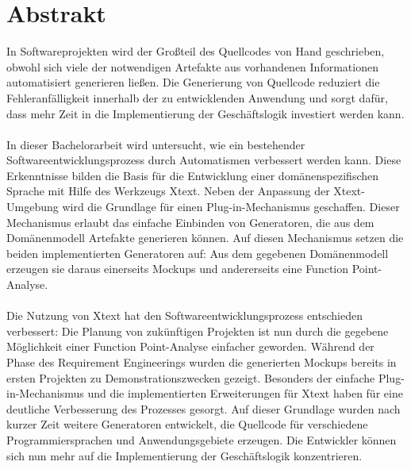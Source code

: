 \documentclass[a4paper,12pt]{scrreprt}
\begin{document}
\chapter{Abstrakt}
In Softwareprojekten wird der Großteil des Quellcodes von Hand geschrieben, obwohl sich viele der notwendigen Artefakte aus vorhandenen Informationen automatisiert generieren ließen. Die Generierung von Quellcode reduziert die Fehleranfälligkeit innerhalb der zu entwicklenden Anwendung und sorgt dafür, dass mehr Zeit in die Implementierung der Geschäftslogik investiert werden kann.
\\
\\
In dieser Bachelorarbeit wird untersucht, wie ein bestehender Softwareentwicklungsprozess durch Automatismen verbessert werden kann. Diese Erkenntnisse bilden die Basis für die Entwicklung einer domänenspezifischen Sprache mit Hilfe des Werkzeugs Xtext. Neben der Anpassung der Xtext-Umgebung wird die Grundlage für einen Plug-in-Mechanismus geschaffen. Dieser Mechanismus erlaubt das einfache Einbinden von Generatoren, die aus dem Domänenmodell Artefakte generieren können. Auf diesen Mechanismus setzen die beiden implementierten Generatoren auf: Aus dem gegebenen Domänenmodell erzeugen sie daraus einerseits Mockups und andererseits eine Function Point-Analyse.
\\
\\
Die Nutzung von Xtext hat den Softwareentwicklungsprozess entschieden verbessert: Die Planung von zukünftigen Projekten ist nun durch die gegebene Möglichkeit einer Function Point-Analyse einfacher geworden. Während der Phase des Requirement Engineerings wurden die generierten Mockups bereits in ersten Projekten zu Demonstrationszwecken gezeigt. Besonders der einfache Plug-in-Mechanismus und die implementierten Erweiterungen für Xtext haben für eine deutliche Verbesserung des Prozesses gesorgt. Auf dieser Grundlage wurden nach kurzer Zeit weitere Generatoren entwickelt, die Quellcode für verschiedene Programmiersprachen und Anwendungsgebiete erzeugen. Die Entwickler können sich nun mehr auf die Implementierung der Geschäftslogik konzentrieren.
\end{document}
